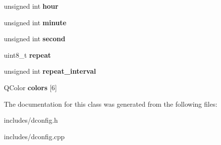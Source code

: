 \begin{DoxyCompactItemize}
\item 
\hypertarget{class_d_config_a595cbebf483fdb2d48c83d5ad2715258}{
unsigned int {\bfseries hour}}
\label{class_d_config_a595cbebf483fdb2d48c83d5ad2715258}

\item 
\hypertarget{class_d_config_aa9b1e1219f6fa3ab82a54bbcfd3cd6bd}{
unsigned int {\bfseries minute}}
\label{class_d_config_aa9b1e1219f6fa3ab82a54bbcfd3cd6bd}

\item 
\hypertarget{class_d_config_a3816f3dbc247f0f7e74ccd73bf399a91}{
unsigned int {\bfseries second}}
\label{class_d_config_a3816f3dbc247f0f7e74ccd73bf399a91}

\item 
\hypertarget{class_d_config_a55cfe8cf6f412f64d2a4656e7d5964a9}{
uint8\_\-t {\bfseries repeat}}
\label{class_d_config_a55cfe8cf6f412f64d2a4656e7d5964a9}

\item 
\hypertarget{class_d_config_a3bbf9ede5efa4c91a4aee84d36a575c7}{
unsigned int {\bfseries repeat\_\-interval}}
\label{class_d_config_a3bbf9ede5efa4c91a4aee84d36a575c7}

\item 
\hypertarget{class_d_config_a44e1595a55d4930358a573ecf13d0d11}{
QColor {\bfseries colors} \mbox{[}6\mbox{]}}
\label{class_d_config_a44e1595a55d4930358a573ecf13d0d11}

\end{DoxyCompactItemize}


The documentation for this class was generated from the following files:\begin{DoxyCompactItemize}
\item 
includes/dconfig.h\item 
includes/dconfig.cpp\end{DoxyCompactItemize}
